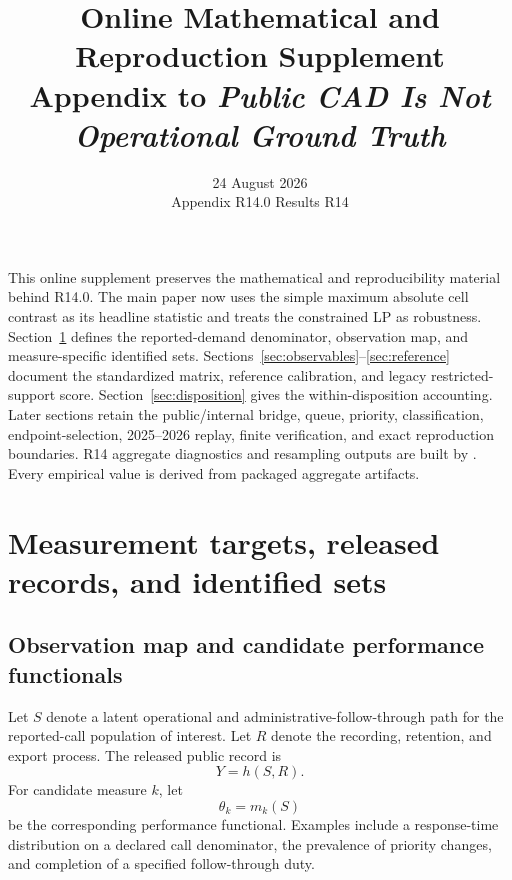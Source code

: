 \documentclass[11pt]{article}
\title{\vspace{-1.6em}\textbf{Online Mathematical and Reproduction Supplement}\\[0.35em]
\large Appendix to \emph{Public CAD Is Not Operational Ground Truth}}
\author{}
\date{24 August 2026\\[0.2em]\small Appendix R14.0 \quad Results R14}
\begin{document}
\maketitle
\thispagestyle{plain}
\vspace{-1.2em}

\begin{plainbox}[title=Purpose and reading guide]
This online supplement preserves the mathematical and reproducibility material behind R14.0. The main paper now uses the simple maximum absolute cell contrast as its headline statistic and treats the constrained LP as robustness. Section~\ref{sec:measurement_map} defines the reported-demand denominator, observation map, and measure-specific identified sets. Sections~\ref{sec:observables}--\ref{sec:reference} document the standardized matrix, reference calibration, and legacy restricted-support score. Section~\ref{sec:disposition} gives the within-disposition accounting. Later sections retain the public/internal bridge, queue, priority, classification, endpoint-selection, 2025--2026 replay, finite verification, and exact reproduction boundaries. R14 aggregate diagnostics and resampling outputs are built by . Every empirical value is derived from packaged aggregate artifacts.
\end{plainbox}

\setcounter{tocdepth}{1}
\begingroup
\small
\tableofcontents
\endgroup
\newpage

\section{Measurement targets, released records, and identified sets}
\label{sec:measurement_map}

\subsection{Observation map and candidate performance functionals}

Let $S$ denote a latent operational and administrative-follow-through path for the reported-call population of interest. Let $R$ denote the recording, retention, and export process. The released public record is
\begin{equation}
Y=h(S,R).
\label{eq:observation_map}
\end{equation}
For candidate measure $k$, let
\begin{equation}
\theta_k=m_k(S)
\label{eq:performance_functional}
\end{equation}
be the corresponding performance functional. Examples include a response-time distribution on a declared call denominator, the prevalence of priority changes, and completion of a specified follow-through duty.
\end{document}
